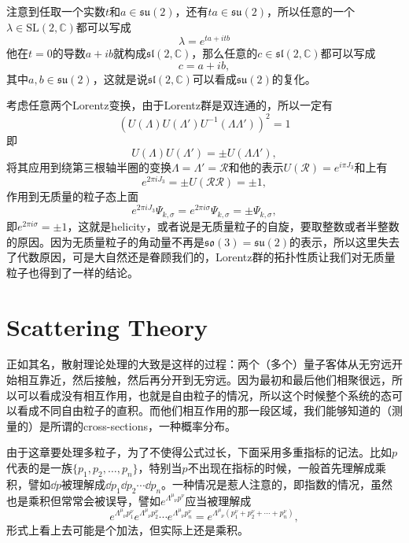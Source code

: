 注意到任取一个实数$t$和$a\in\mathfrak{su}(2)$，还有$ta \in\mathfrak{su}(2)$，所以任意的一个$\lambda \in \mathrm{SL}(2,\mathbb{C})$都可以写成
\[
\lambda=e^{ta+itb}
\]
他在$t=0$的导数$a+ib$就构成$\mathfrak{sl}(2,\mathbb{C})$，那么任意的$c\in \mathfrak{sl}(2,\mathbb{C})$都可以写成
\[
c=a+ib,
\]
其中$a,b\in\mathfrak{su}(2)$，这就是说$\mathfrak{sl}(2,\mathbb{C})$可以看成$\mathfrak{su}(2)$的复化。

考虑任意两个Lorentz变换，由于Lorentz群是双连通的，所以一定有
\[
\left(U(\Lambda)U(\Lambda')U^{-1}(\Lambda\Lambda')\right)^2=1
\]
即
\[
U(\Lambda)U(\Lambda')=\pm U(\Lambda\Lambda'),
\]
将其应用到绕第三根轴半圈的变换$\Lambda=\Lambda'=\mathscr{R}$和他的表示$U(\mathscr{R})=e^{i\pi J_3}$和上有
\[
e^{2\pi iJ_3}=\pm U(\mathscr{R}\mathscr{R})=\pm 1,
\]
作用到无质量的粒子态上面
\[
e^{2\pi iJ_3}\Psi_{k,\sigma}=e^{2\pi i\sigma}\Psi_{k,\sigma}=\pm \Psi_{k,\sigma},
\]
即$e^{2\pi i\sigma}=\pm 1$，这就是helicity，或者说是无质量粒子的自旋，要取整数或者半整数的原因。因为无质量粒子的角动量不再是$\mathfrak{so}(3)=\mathfrak{su}(2)$的表示，所以这里失去了代数原因，可是大自然还是眷顾我们的，Lorentz群的拓扑性质让我们对无质量粒子也得到了一样的结论。

\chapter{Scattering Theory}

正如其名，散射理论处理的大致是这样的过程：两个（多个）量子客体从无穷远开始相互靠近，然后接触，然后再分开到无穷远。因为最初和最后他们相聚很远，所以可以看成没有相互作用，也就是自由粒子的情况，所以这个时候整个系统的态可以看成不同自由粒子的直积。而他们相互作用的那一段区域，我们能够知道的（测量的）是所谓的cross-sections，一种概率分布。

由于这章要处理多粒子，为了不使得公式过长，下面采用多重指标的记法。比如$p$代表的是一族$\{p_1,p_2,\dots,p_n\}$，特别当$p$不出现在指标的时候，一般首先理解成乘积，譬如$\dd p$被理解成$\dd p_1\dd p_2\cdots \dd p_n$。一种情况是惹人注意的，即指数的情况，虽然也是乘积但常常会被误导，譬如$e^{\Lambda^\mu_{\phantom{\mu}\nu}p^\nu}$应当被理解成
\[e^{\Lambda^\mu_{\phantom{\mu}\nu}p_1^\nu}e^{\Lambda^\mu_{\phantom{\mu}\nu}p_2^\nu}\cdots e^{\Lambda^\mu_{\phantom{\mu}\nu}p_n^\nu}=e^{\Lambda^\mu_{\phantom{\mu}\nu}(p_1^\nu+p_2^\nu+\cdots+p_n^\nu)},\]
形式上看上去可能是个加法，但实际上还是乘积。

